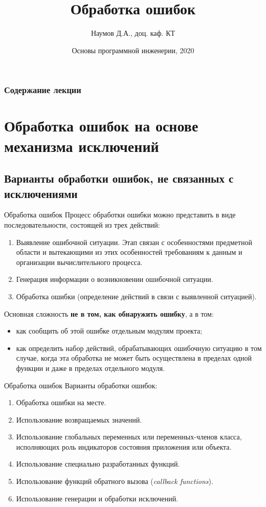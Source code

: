 \documentclass[xcolor=table]{beamer}
\title[Software Design]{Обработка ошибок}
\author{Наумов Д.А., доц. каф. КТ}
\date[01.11.2020] {Основы программной инженерии, 2020}
\begin{document}
\begin{frame}
  \titlepage
\end{frame}
  
\begin{frame}
  \frametitle{Содержание лекции}
  \tableofcontents  
\end{frame}

\section{Обработка ошибок на основе механизма исключений}

\subsection{Варианты обработки ошибок, не связанных с исключениями}

\begin{frame}{Обработка ошибок}
	Процесс обработки ошибки можно представить в виде последовательности, состоящей из трех действий:
	\begin{enumerate}
		\item Выявление ошибочной ситуации. Этап связан с особенностями предметной области и вытекающими из этих особенностей требованиям к данным и организации вычислительного процесса.
		\item Генерация информации о возникновении ошибочной ситуации.
		\item Обработка ошибки (определение действий в связи с выявленной ситуацией).
	\end{enumerate}
	Основная сложность \textbf{не в том, как обнаружить ошибку}, а в том:
	\begin{itemize}
		\item как сообщить об этой ошибке отдельным модулям проекта;
		\item как определить набор действий, обрабатывающих ошибочную ситуацию в том случае, когда эта обработка не может быть осуществлена в пределах одной функции и даже в пределах отдельного модуля.
	\end{itemize}
\end{frame}


\begin{frame}{Обработка ошибок}
	Варианты обработки ошибок:
	\begin{enumerate}
		\item Обработка ошибки на месте.
		\item Использование возвращаемых значений.
		\item Использование глобальных переменных или переменных-членов класса, 	исполняющих роль индикаторов состояния приложения или объекта.
		\item Использование специально разработанных функций.
		\item Использование функций обратного вызова (\textit{callback functions}).
		\item Использование генерации и обработки исключений.
	\end{enumerate}
\end{frame}
\end{document}

